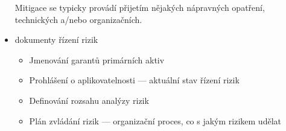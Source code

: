 \begin{itemize}
	Mitigace se typicky provádí přijetím nějakých nápravných opatření, technických a/nebo organizačních.
	
	\item dokumenty řízení rizik
	
	\begin{itemize}
		\item Jmenování garantů primárních aktiv
		\item Prohlášení o aplikovatelnosti --- aktuální stav řízení rizik
		\item Definování rozsahu analýzy rizik
		\item Plán zvládání rizik --- organizační proces, co s jakým rizikem udělat
	\end{itemize}
\end{itemize}